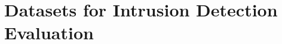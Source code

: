\chapter{Datasets for Intrusion Detection Evaluation}
\label{app:datasets}

\textcolor{dimgray}{\lipsum}